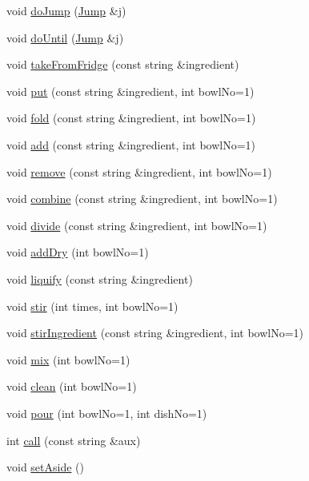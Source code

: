 \begin{DoxyCompactItemize}
\item 
void \hyperlink{group__Command_ga003607cfe3ab13de0bc6b85d659856bc}{do\-Jump} (\hyperlink{structJump}{Jump} \&j)
\item 
void \hyperlink{group__Command_gadad4684f1b60dbabd7ac9b8ac9816d32}{do\-Until} (\hyperlink{structJump}{Jump} \&j)
\item 
void \hyperlink{group__Command_ga5119039470b26422e6ec843515d4a720}{take\-From\-Fridge} (const string \&ingredient)
\item 
void \hyperlink{group__Command_ga928df02758f8f959f4beeb153ddde7d6}{put} (const string \&ingredient, int bowl\-No=1)
\item 
void \hyperlink{group__Command_gaf5f825d69a4a19837a0714715710734a}{fold} (const string \&ingredient, int bowl\-No=1)
\item 
void \hyperlink{group__Command_ga385cb79270fb9c857256ef79ff65010e}{add} (const string \&ingredient, int bowl\-No=1)
\item 
void \hyperlink{group__Command_ga31fa0f785049498f85ab6e299217c7ab}{remove} (const string \&ingredient, int bowl\-No=1)
\item 
void \hyperlink{group__Command_ga276a0e85ac154372bf1c4cdaf7304d09}{combine} (const string \&ingredient, int bowl\-No=1)
\item 
void \hyperlink{group__Command_ga5d32e4fe23897d4dbb0b10eb4821baeb}{divide} (const string \&ingredient, int bowl\-No=1)
\item 
void \hyperlink{group__Command_ga7c657ea9ec19dfb55292a7474fe12511}{add\-Dry} (int bowl\-No=1)
\item 
void \hyperlink{group__Command_gaf44790b96aebd727ff3d7ccbbf9ff568}{liquify} (const string \&ingredient)
\item 
void \hyperlink{group__Command_ga5b48c67eb04fc71c199bdf611c387c9e}{stir} (int times, int bowl\-No=1)
\item 
void \hyperlink{group__Command_ga2678e5c7db062e186ca947018050f5c2}{stir\-Ingredient} (const string \&ingredient, int bowl\-No=1)
\item 
void \hyperlink{group__Command_gad9a02b3a48b606ba17dc91337c3f64c2}{mix} (int bowl\-No=1)
\item 
void \hyperlink{group__Command_gae041e0eb15d1e40fe513b53803810dac}{clean} (int bowl\-No=1)
\item 
void \hyperlink{group__Command_ga03848074a9e527439e6381e47d9f3749}{pour} (int bowl\-No=1, int dish\-No=1)
\item 
int \hyperlink{group__Command_ga2485acb9291f44d16222f15a75ff27fb}{call} (const string \&aux)
\item 
void \hyperlink{group__Command_ga4889710ccae668fb039e4dfa0ea2dae7}{set\-Aside} ()
\end{DoxyCompactItemize}
